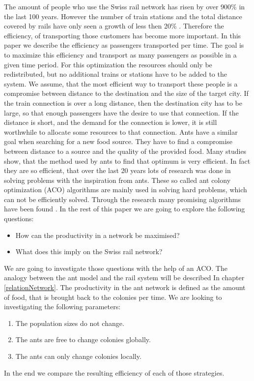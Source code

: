 The amount of people who use the Swiss rail network has risen by over 900\% in the last 100 years. However the number of train stations and the total distance covered by rails have only seen a growth of less then 20\% \citep{SbbStats}. Therefore the efficiency, of transporting those customers has become more important. In this paper we describe the efficiency as passengers transported per time. The goal is to maximize this efficiency and transport as many passengers as possible in a given time period. For this optimization the resources should only be redistributed, but no additional trains or stations have to be added to the system. 
We assume, that the most efficient way to transport these people is a compromise between distance to the destination and the size of the target city. If the train connection is over a long distance, then the destination city has to be large, so that enough passengers have the desire to use that connection. If the distance is short, and the demand for the connection is lower, it is still worthwhile to allocate some resources to that connection.
Ants have a similar goal when searching for a new food source. They have to find a compromise between distance to a source and the quality of the provided food. Many studies show, that the method used by ants to find that optimum is very efficient. In fact they are so efficient, that over the last 20 years lots of research was done in solving problems with the inspiration from ants. These so called ant colony optimization (ACO) algorithms are mainly used in solving hard problems, which can not be efficiently solved. Through the research many promising algorithms have been found \citep{Aco1}.
In the rest of this paper we are going to explore the following questions:
\begin{itemize}
  \item How can the productivity in a network be maximised?
  \item What does this imply on the Swiss rail network?
\end{itemize}
We are going to investigate those questions with the help of an ACO. The analogy between the ant model and the rail system will be described In chapter \ref{relationNetwork}. The productivity in the ant network is defined as the amount of food, that is brought back to the colonies per time. We are looking to investigating the following parameters:
\begin{enumerate}
	\item The population sizes do not change.
	\item The ants are free to change colonies globally.
	\item The ants can only change colonies locally.
\end{enumerate}
In the end we compare the resulting efficiency of each of those strategies. 
